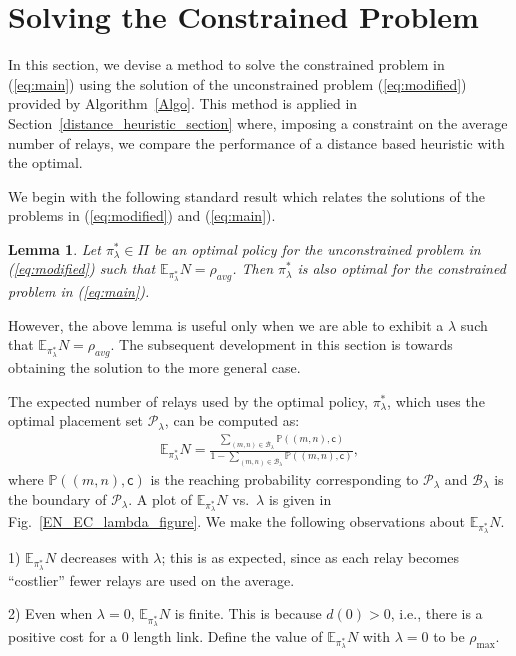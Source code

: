 \documentclass[conference]{IEEEtran}
\newtheorem{lemma}{Lemma}
\begin{document}
\section{Solving the Constrained Problem} 
\label{EN_lambda}
In this section, we devise a method to solve the constrained problem in (\ref{eq:main}) using the 
solution of the unconstrained problem (\ref{eq:modified}) provided by Algorithm~\ref{Algo}. 
This method is applied in Section~\ref{distance_heuristic_section} where, imposing a constraint
on the average number of relays, we compare the performance of
a distance based heuristic with the optimal.

We begin with the following standard result which relates the solutions
of the problems in (\ref{eq:modified}) and (\ref{eq:main}).
\begin{lemma}
\label{relation_lemma}
Let $\pi_{\lambda}^*\in \Pi$ be an optimal policy for the unconstrained problem in
(\ref{eq:modified}) such that $\mathbb{E}_{\pi_{\lambda}^*}N=\rho_{avg}$. 
Then $\pi_{\lambda}^*$ is also optimal for the constrained problem in
(\ref{eq:main}).
\end{lemma}
However, the above lemma is useful only when we are able to exhibit a $\lambda$ such that
$\mathbb{E}_{\pi_{\lambda}^*}N=\rho_{avg}$. The subsequent development in this section
is towards obtaining the solution to the more general case.

The expected number of relays used by the optimal policy, $\pi_{\lambda}^*$, which uses the optimal 
placement set $\mathcal{P}_{\lambda}$, can be computed as:
\begin{eqnarray}
\mathbb{E}_{\pi_{\lambda}^*}N= \frac{\sum_{(m,n)\in \mathcal{B}_{\lambda}}\mathbb{P}((m,n),\mathsf{c})}{1-\sum_{(m,n)\in \mathcal{B}_{\lambda}}\mathbb{P}((m,n),\mathsf{c})},
\end{eqnarray}
where $\mathbb{P}((m,n),\mathsf{c})$ is the reaching probability corresponding to $\mathcal{P}_\lambda$ 
and $\mathcal{B}_{\lambda}$ is the boundary of $\mathcal{P}_\lambda$.
A plot of $\mathbb{E}_{\pi_{\lambda}^*}N$ vs.\ $\lambda$ is given in Fig.~\ref{EN_EC_lambda_figure}. 
We make the following observations about $\mathbb{E}_{\pi_{\lambda}^*} N$.

1) $\mathbb{E}_{\pi_{\lambda}^*} N$ decreases with $\lambda$; this is as expected, since as 
each relay becomes ``costlier'' fewer relays are used on the average.

2) Even when $\lambda = 0$, $\mathbb{E}_{\pi_{\lambda}^*} N$ is finite. This is because 
$d(0)> 0$, i.e., there is a positive cost for a $0$ length link. Define the value of 
$\mathbb{E}_{\pi_{\lambda}^*} N$  with $\lambda = 0$ to be $\rho_{\max}$.
\end{document}
